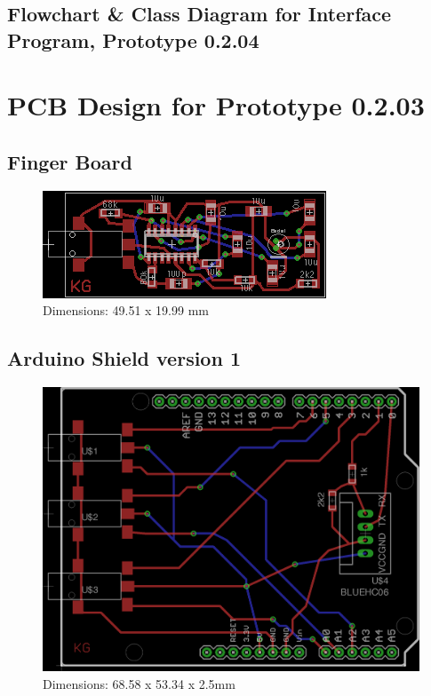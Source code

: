 \subsection{Flowchart \& Class Diagram for Interface Program, Prototype 0.2.04}

\newpage
\section{PCB Design for Prototype 0.2.03}

\subsection{Finger Board}
\label{fingerboardpcb}
\begin{figure}[H]
\centering
\includegraphics[scale = 2]{Images/mic_pcb_02}
\\ Dimensions: 49.51 x 19.99 mm
\end{figure}

\subsection{Arduino Shield version 1}
\label{ardshieldpcb}
\begin{figure}[H]
\centering
\includegraphics[scale = 1.5]{Images/ard_pcb_01}
\\ Dimensions: 68.58 x 53.34 x 2.5mm
\end{figure}

